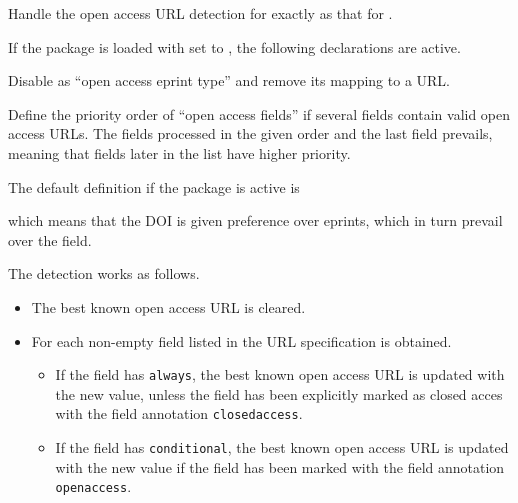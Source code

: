 \documentclass[DIV=9]{scrartcl}
\begin{document}
\begin{ltxsyntax}

Handle the open access URL detection for  exactly as that for
.

If the package is loaded with  set to ,
the following declarations are active.
\begin{biblatexcode}
\end{biblatexcode}


Disable  as \enquote{open access eprint type} and remove its
mapping to a URL.


Define the priority order of \enquote{open access fields} if several fields
contain valid open access URLs.
The fields processed in the given order and the last field prevails, meaning
that fields later in the list have higher priority.

The default definition if the package is active is
\begin{biblatexcode}
\end{biblatexcode}
which means that the DOI is given preference over eprints, which in turn
prevail over the  field.
\end{ltxsyntax}

The  detection works as follows.
\begin{itemize}
\item The best known open access URL is cleared.
\item For each non-empty field listed in
   the URL specification is
  obtained.
  \begin{itemize}
    \item If the field has  \texttt{always}, the best known open
    access URL is updated with the new value, unless the field has been
    explicitly marked as closed acces with the field annotation
    \texttt{closedaccess}.
    \item If the field has  \texttt{conditional}, the best known
    open access URL is updated with the new value if the field has been marked
    with the field annotation \texttt{openaccess}.
  \end{itemize}
\end{itemize}
\end{document}

